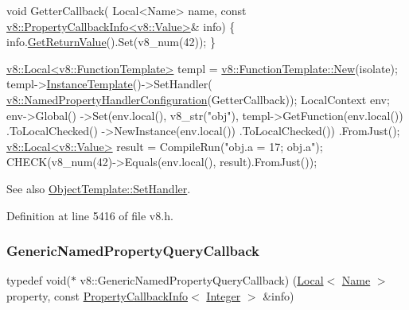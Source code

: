 \begin{DoxyCode}
\textcolor{keywordtype}{void} GetterCallback(
  Local<Name> name,
  \textcolor{keyword}{const} \mbox{\hyperlink{classv8_1_1PropertyCallbackInfo}{v8::PropertyCallbackInfo<v8::Value>}}& info) \{
    info.\mbox{\hyperlink{classv8_1_1PropertyCallbackInfo_aa0882946929c3c4df6d131fe0d8d6746}{GetReturnValue}}().Set(v8\_num(42));
\}

\mbox{\hyperlink{classv8_1_1Local}{v8::Local<v8::FunctionTemplate>}} templ =
    \mbox{\hyperlink{classv8_1_1FunctionTemplate_a3b675b8327f08a7c6a4c4d9dce5cb3b3}{v8::FunctionTemplate::New}}(isolate);
templ->\mbox{\hyperlink{classv8_1_1FunctionTemplate_a00dd9725566908e8fd14064542f5a781}{InstanceTemplate}}()->SetHandler(
    \mbox{\hyperlink{structv8_1_1NamedPropertyHandlerConfiguration}{v8::NamedPropertyHandlerConfiguration}}(GetterCallback));
LocalContext env;
env->Global()
    ->Set(env.local(), v8\_str(\textcolor{stringliteral}{"obj"}), templ->GetFunction(env.local())
                                           .ToLocalChecked()
                                           ->NewInstance(env.local())
                                           .ToLocalChecked())
    .FromJust();
\mbox{\hyperlink{classv8_1_1Local}{v8::Local<v8::Value>}} result = CompileRun(\textcolor{stringliteral}{"obj.a = 17; obj.a"});
CHECK(v8\_num(42)->Equals(env.local(), result).FromJust());
\end{DoxyCode}


See also {\ttfamily \mbox{\hyperlink{classv8_1_1ObjectTemplate_a3d5666f1e9b0f46df6b4dbb7cfbb6114}{Object\+Template\+::\+Set\+Handler}}}. 

Definition at line 5416 of file v8.\+h.

\mbox{\label{namespacev8_add9f7ab11e4a9a2b9ad2c4536b0e1a64}} 
\subsubsection{\texorpdfstring{Generic\+Named\+Property\+Query\+Callback}{GenericNamedPropertyQueryCallback}}
{\footnotesize\ttfamily typedef void($\ast$ v8\+::\+Generic\+Named\+Property\+Query\+Callback) (\mbox{\hyperlink{classv8_1_1Local}{Local}}$<$ \mbox{\hyperlink{classv8_1_1Name}{Name}} $>$ property, const \mbox{\hyperlink{classv8_1_1PropertyCallbackInfo}{Property\+Callback\+Info}}$<$ \mbox{\hyperlink{classv8_1_1Integer}{Integer}} $>$ \&info)}

